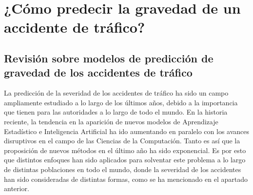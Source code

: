 \documentclass{uathesis-es}
\begin{document}


\section{¿Cómo predecir la gravedad de un accidente de tráfico?}

\subsection*{Revisión sobre modelos de predicción de gravedad de los accidentes de tráfico}

La predicción de la severidad de los accidentes de tráfico ha sido un campo ampliamente estudiado a lo largo de los últimos años, debido a la importancia que tienen para las autoridades a lo largo de todo el mundo. En la historia reciente, la tendencia en la aparición de nuevos modelos de Aprendizaje Estadístico e Inteligencia Artificial ha ido aumentando en paralelo con los avances disruptivos en el campo de las Ciencias de la Computación. Tanto es así que la proposición de nuevos métodos en el último año ha sido exponencial. Es por esto que distintos enfoques han sido aplicados para solventar este problema a lo largo de distintas poblaciones en todo el mundo, donde la severidad de los accidentes han sido consideradas de distintas formas, como se ha mencionado en el apartado anterior.
\end{document}
